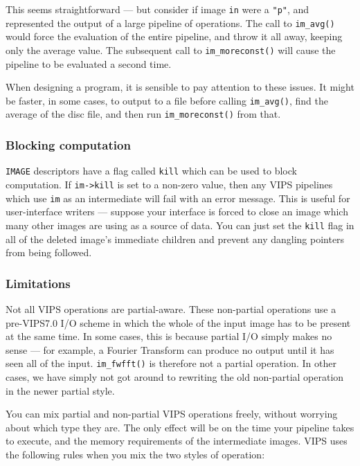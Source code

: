 This seems straightforward --- but consider if image \verb+in+ were a
\verb+"p"+, and represented the output of a large pipeline of operations. The
call to \verb+im_avg()+ would force the evaluation of the entire pipeline,
and throw it all away, keeping only the average value. The subsequent call to
\verb+im_moreconst()+ will cause the pipeline to be evaluated a second time.

When designing a program, it is sensible to pay attention to these
issues. It might be faster, in some cases, to output to a file before
calling \verb+im_avg()+, find the average of the disc file, and then run
\verb+im_moreconst()+ from that.

\subsubsection{Blocking computation}
\label{sec:block}

\verb+IMAGE+ descriptors have a flag called \verb+kill+ which can be used
to block computation.  If \verb+im->kill+ is set to a non-zero value,
then any VIPS pipelines which use \verb+im+ as an intermediate will fail
with an error message.  This is useful for user-interface writers ---
suppose your interface is forced to close an image which many other images
are using as a source of data. You can just set the \verb+kill+ flag in all
of the deleted image's immediate children and prevent any dangling pointers
from being followed.

\subsubsection{Limitations}
\label{sec:limit}

Not all VIPS operations are partial-aware. These non-partial operations
use a pre-VIPS7.0 I/O scheme in which the whole of the input image has to
be present at the same time.  In some cases, this is because partial I/O
simply makes no sense --- for example, a Fourier Transform can produce no
output until it has seen all of the input.  \verb+im_fwfft()+ is therefore
not a partial operation. In other cases, we have simply not got around to
rewriting the old non-partial operation in the newer partial style.

You can mix partial and non-partial VIPS operations freely, without worrying
about which type they are. The only effect will be on the time your pipeline
takes to execute, and the memory requirements of the intermediate images. VIPS
uses the following rules when you mix the two styles of operation:

